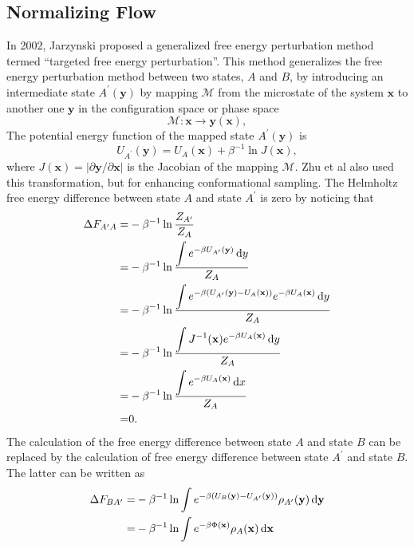 \subsection{Normalizing Flow\label{Sec:FEM:NF}}
In 2002, Jarzynski proposed a generalized free energy perturbation method termed ``targeted free energy perturbation''.\cite{JarzynskiPRE2002} This method generalizes the free energy perturbation method between two states, $A$ and $B$, by introducing an intermediate state $A^\prime(\mathbf{y})$ by mapping $\mathcal{M}$ from the microstate of the system $\mathbf{x}$ to another one $\mathbf{y}$ in the configuration space or phase space
\begin{equation}
	\mathcal{M}: \mathbf{x} \to \mathbf{y}(\mathbf{x}),
\end{equation}
The potential energy function of the mapped state $A^\prime(\mathbf{y})$ is
\begin{equation}
	U_{A^\prime}(\mathbf{y})=U_A(\mathbf{x})+\beta^{-1}\ln J(\mathbf{x}),
\end{equation}
where $J(\mathbf{x})=|\partial \mathbf{y}/\partial \mathbf{x}|$ is the Jacobian of the mapping $\mathcal{M}$. Zhu et al also used this transformation, but for enhancing conformational sampling.\cite{ZhuPRL2002} The Helmholtz free energy difference between state $A$ and state $A^\prime$ is zero by noticing that
\begin{align*}
	\Delta F_{A^\prime A}=&-\beta^{-1}\ln\frac{Z_{A^\prime}}{Z_A}\notag\\
	=&-\beta^{-1}\ln \frac{\displaystyle\int e^{-\beta U_{A^\prime}(\mathbf{y})}\mathop{}\!\mathrm{d} y}{Z_A}\notag\\
	=&-\beta^{-1}\ln \frac{\displaystyle\int e^{-\beta (U_{A^\prime}(\mathbf{y})-U_A(\mathbf{x}))}e^{-\beta U_A(\mathbf{x})}\mathop{}\!\mathrm{d} y}{Z_A}\notag\\
	=&-\beta^{-1}\ln \frac{\displaystyle\int J^{-1}(\mathbf{x})e^{-\beta U_A(\mathbf{x})}\mathop{}\!\mathrm{d} y}{Z_A}\notag\\
	=&-\beta^{-1}\ln \frac{\displaystyle\int e^{-\beta U_A(\mathbf{x})}\mathop{}\!\mathrm{d} x}{Z_A}\notag\\
	=&0.
\end{align*}
The calculation of the free energy difference between state $A$ and state $B$ can be replaced by the calculation of free energy difference between state $A^\prime$ and state $B$. The latter can be written as
\begin{align}
	\Delta F_{BA^\prime}=&-\beta^{-1}\ln {\int e^{-\beta (U_B(\mathbf{y})-U_{A^\prime}(\mathbf{y}))}\rho_{A^\prime}(\mathbf{y})\mathop{}\!\mathrm{d}\mathbf{y}}\notag\\
	=&-\beta^{-1}\ln {\int e^{-\beta \Phi(\mathbf{x})}\rho_{A}(\mathbf{x})\mathop{}\!\mathrm{d}\mathbf{x}}
\end{align}
